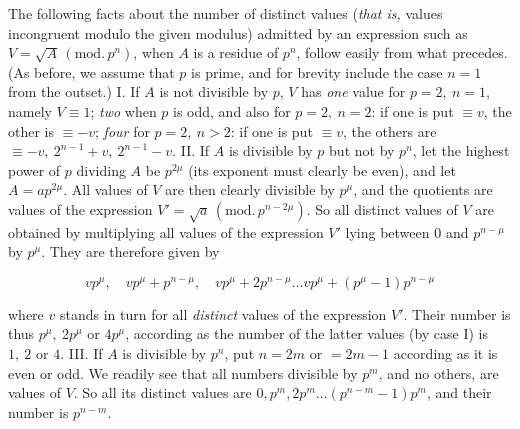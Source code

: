 The following facts about the number of distinct values (\emph{that is,} values incongruent modulo the given modulus) admitted by an expression such as $V=\surd A\,(\mathrm{mod.}\,p^n)$, when $A$ is a residue of $p^n$, follow easily from what precedes. (As before, we assume that $p$ is prime, and for brevity include the case $n=1$ from the outset.) I. If $A$ is not divisible by $p$, $V$ has \emph{one} value for $p=2,\ n=1$, namely $V \equiv1$; \emph{two} when $p$ is odd, and also for $p=2,\ n=2$: if one is put $\equiv v$, the other is $\equiv-v$; \emph{four} for $p=2,\ n>2$: if one is put $\equiv v$, the others are $\equiv-v,\ 2^{n-1}+v,\ 2^{n-1}-v$. II. If $A$ is divisible by $p$ but not by $p^n$, let the highest power of $p$ dividing $A$ be $p^{2\mu}$ (its exponent must clearly be even), and let $A=ap^{2\mu}$. All values of $V$ are then clearly divisible by $p^\mu$, and the quotients are values of the expression $V'=\surd a\,(\mathrm{mod.}\,p^{n-2\mu})$. So all distinct values of $V$ are obtained by multiplying all values of the expression $V'$ lying between $0$ and $p^{n-\mu}$ by $p^\mu$. They are therefore given by

\[
vp^\mu,\quad
vp^\mu+p^{n-\mu},\quad
vp^\mu+2p^{n-\mu}\ldots vp^\mu+(p^\mu-1)p^{n-\mu}
\]

where $v$ stands in turn for all \emph{distinct} values of the expression $V'$. Their number is thus $p^\mu,\ 2p^\mu$ or $4p^\mu$, according as the number of the latter values (by case I) is $1,\ 2$ or $4$. III. If $A$ is divisible by $p^n$, put $n=2m$ or $=2m-1$ according as it is even or odd. We readily see that all numbers divisible by $p^m$, and no others, are values of $V$. So all its distinct values are $0,p^m,2p^m\ldots(p^{n-m}-1)p^m$, and their number is $p^{n-m}$.


